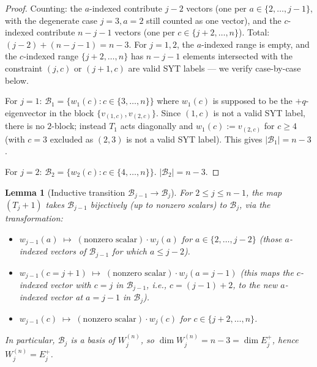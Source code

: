 \documentclass[11pt]{article}
\newtheorem{lemma}[theorem]{Lemma}
\theoremstyle{definition}
\begin{document}
\begin{proof}
Counting: the $a$-indexed contribute $j - 2$ vectors (one per $a \in
\{2,\ldots,j-1\}$, with the degenerate case $j=3, a=2$ still
counted as one vector), and the $c$-indexed contribute $n - j - 1$
vectors (one per $c \in \{j+2,\ldots,n\}$).  Total: $(j-2) + (n-j-1) =
n-3$.  For $j = 1, 2$, the $a$-indexed range is empty, and the
$c$-indexed range $\{j+2,\ldots,n\}$ has $n - j - 1$ elements
intersected with the constraint $(j,c)$ or $(j+1,c)$ are valid SYT
labels --- we verify case-by-case below.

For $j = 1$: $\mathcal{B}_1 = \{w_1(c) : c \in \{3,\ldots,n\}\}$ where
$w_1(c)$ is supposed to be the $+q$-eigenvector in the block
$\{v_{(1,c)}, v_{(2,c)}\}$.  Since $(1,c)$ is not a valid SYT label,
there is no $2$-block; instead $T_1$ acts diagonally and $w_1(c) :=
v_{(2,c)}$ for $c \ge 4$ (with $c = 3$ excluded as $(2,3)$ is not a
valid SYT label).  This gives $|\mathcal{B}_1| = n - 3$.

For $j = 2$: $\mathcal{B}_2 = \{w_2(c) : c \in \{4,\ldots,n\}\}$.
$|\mathcal{B}_2| = n - 3$.
\end{proof}

\begin{lemma}[Inductive transition $\mathcal{B}_{j-1} \to \mathcal{B}_j$]\label{lem:transition}
For $2 \le j \le n-1$, the map $(T_j{+}1)$ takes $\mathcal{B}_{j-1}$
bijectively (up to nonzero scalars) to $\mathcal{B}_j$, via the
transformation:
\begin{itemize}[leftmargin=2em,topsep=0.3em,itemsep=0.2em]
\item $w_{j-1}(a) \;\mapsto\; (\text{nonzero scalar}) \cdot w_j(a)$ for
$a \in \{2,\ldots,j-2\}$ (those $a$-indexed vectors of
$\mathcal{B}_{j-1}$ for which $a \le j-2$).
\item $w_{j-1}(c=j+1) \;\mapsto\; (\text{nonzero scalar}) \cdot w_j(a=j-1)$
(this maps the $c$-indexed vector with $c = j$ in $\mathcal{B}_{j-1}$,
i.e., $c = (j-1)+2$, to the new $a$-indexed vector at
$a = j-1$ in $\mathcal{B}_j$).
\item $w_{j-1}(c) \;\mapsto\; (\text{nonzero scalar}) \cdot w_j(c)$
for $c \in \{j+2,\ldots,n\}$.
\end{itemize}
In particular, $\mathcal{B}_j$ is a basis of $W_j^{(n)}$, so
$\dim W_j^{(n)} = n-3 = \dim E_j^+$, hence $W_j^{(n)} = E_j^+$.
\end{lemma}
\end{document}
